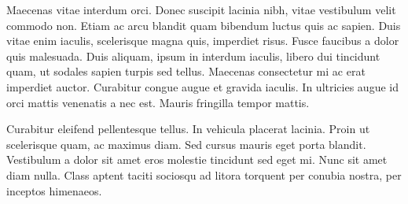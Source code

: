 Maecenas vitae interdum orci. Donec suscipit lacinia nibh, vitae vestibulum velit commodo non. Etiam ac arcu blandit quam bibendum luctus quis ac sapien. Duis vitae enim iaculis, scelerisque magna quis, imperdiet risus. Fusce faucibus a dolor quis malesuada. Duis aliquam, ipsum in interdum iaculis, libero dui tincidunt quam, ut sodales sapien turpis sed tellus. Maecenas consectetur mi ac erat imperdiet auctor. Curabitur congue augue et gravida iaculis. In ultricies augue id orci mattis venenatis a nec est. Mauris fringilla tempor mattis.

Curabitur eleifend pellentesque tellus. In vehicula placerat lacinia. Proin ut scelerisque quam, ac maximus diam. Sed cursus mauris eget porta blandit. Vestibulum a dolor sit amet eros molestie tincidunt sed eget mi. Nunc sit amet diam nulla. Class aptent taciti sociosqu ad litora torquent per conubia nostra, per inceptos himenaeos. 
